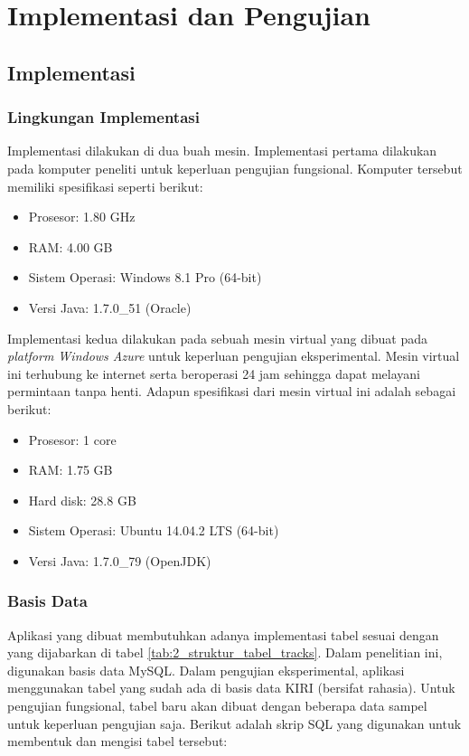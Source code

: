 \chapter{Implementasi dan Pengujian}

\section{Implementasi}

\subsection{Lingkungan Implementasi}

Implementasi dilakukan di dua buah mesin. Implementasi pertama dilakukan pada komputer peneliti untuk keperluan pengujian fungsional. Komputer tersebut memiliki spesifikasi seperti berikut:

\begin{itemize}
	\item Prosesor: 1.80 GHz
	\item RAM: 4.00 GB
	\item Sistem Operasi: Windows 8.1 Pro (64-bit)
	\item Versi Java: 1.7.0\_51 (Oracle)
\end{itemize}

Implementasi kedua dilakukan pada sebuah mesin virtual yang dibuat pada \textit{platform Windows Azure} untuk keperluan pengujian eksperimental. Mesin virtual ini terhubung ke internet serta beroperasi 24 jam sehingga dapat melayani permintaan tanpa henti. Adapun spesifikasi dari mesin virtual ini adalah sebagai berikut:

\begin{itemize}
	\item Prosesor: 1 core
	\item RAM: 1.75 GB
	\item Hard disk: 28.8 GB
	\item Sistem Operasi: Ubuntu 14.04.2 LTS (64-bit)
	\item Versi Java: 1.7.0\_79 (OpenJDK)
\end{itemize}

\subsection{Basis Data}

Aplikasi yang dibuat membutuhkan adanya implementasi tabel sesuai dengan yang dijabarkan di tabel \ref{tab:2_struktur_tabel_tracks}. Dalam penelitian ini, digunakan basis data MySQL\cite{mysql}. Dalam pengujian eksperimental, aplikasi menggunakan tabel yang sudah ada di basis data KIRI (bersifat rahasia). Untuk pengujian fungsional, tabel baru akan dibuat dengan beberapa data sampel untuk keperluan pengujian saja. Berikut adalah skrip SQL yang digunakan untuk membentuk dan mengisi tabel tersebut:

